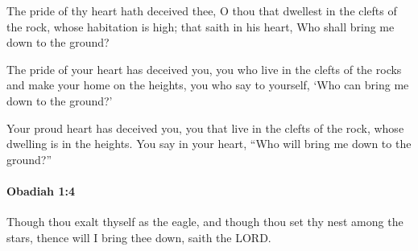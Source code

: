 			\begin{versebox}
					\item[BHS] 
					\item[LXX] 
					\item[ASV] The pride of thy heart hath deceived thee, O thou that dwellest in the clefts of the rock, whose habitation is high; that saith in his heart, Who shall bring me down to the ground?
					\item[NIV] The pride of your heart has deceived you, you who live in the clefts of the rocks and make your home on the heights, you who say to yourself, ‘Who can bring me down to the ground?’
					\item[NRSV] Your proud heart has deceived you, you that live in the clefts of the rock, whose dwelling is in the heights. You say in your heart, “Who will bring me down to the ground?”
			\end{versebox}

		\paragraph{Obadiah 1:4} %
			\label{OBADIAH-1-4}

			Though thou exalt thyself as the eagle, and though thou set thy nest among the stars, thence will I bring thee down, saith the LORD.

